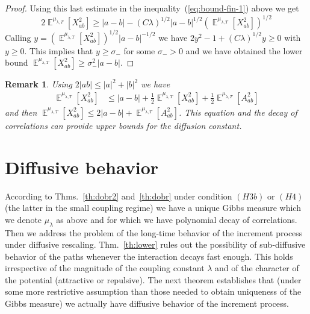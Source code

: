 \documentclass[a4paper,12pt,reqno]{amsart}
\newtheorem{remark}[theorem]{Remark}
\DeclareMathOperator{\expect}{{\mathbb E}}
\begin{document}
\begin{proof}
Using this last estimate in the inequality~(\ref{eq:bound-fin-1}) above we get
\begin{equation*}
 2 \expect^{\mu_{\lambda,T}} [X_{ab}^2 ] \ge 
|a-b| - (C\lambda)^{1/2}|a-b|^{1/2} 
\left(\expect^{\mu_{\lambda,T}}[ X_{ab}^2]\right)^{1/2} 
\end{equation*}
Calling $y = \left(\expect^{\mu_{\lambda,T}}[ X_{ab}^2]\right)^{1/2} |a-b|^{-1/2}$ we have
$
 2 y^2 -1 + (C\lambda)^{1/2}y \ge 0
$
with $y \ge 0$. This implies that $y \ge \sigma_-$ for some $\sigma_-> 0$ and we have obtained the lower bound
$
\expect^{\mu_{\lambda,T}} [X_{ab}^2 ] \ge \sigma^2_- |a-b|
$.
\end{proof}



\begin{remark}
Using
$
2|ab| \le |a|^2+|b|^2
$
we have
\begin{equation*}
  \begin{split}
\expect^{\mu_{\lambda,T}} [X_{ab}^2] & \le  |a-b| + \frac{1}{2}
 \expect^{\mu_{\lambda,T}} [X_{ab}^2]      
 + \frac{1}{2} \expect^{\mu_{\lambda,T}} \left[A_{ab}^2 \right]      
  \end{split}
\end{equation*}
and then
$\expect^{\mu_{\lambda,T}} [X_{ab}^2]  \le  2 |a-b| + \expect^{\mu_{\lambda,T}} \left[A_{ab}^2\right]      
$.
This equation and the decay of correlations can provide upper bounds for the diffusion constant.  
\end{remark}



\section{Diffusive behavior}
\label{sec:diffusive}
According to Thms.~\ref{th:dobr2} and~\ref{th:dobr} under condition $(H3b)$ or $(H4)$
(the latter in the small coupling regime)  we have a unique 
Gibbs measure  which we denote $\mu_\lambda$ as above and for which we
have polynomial decay of correlations.  
Then we address the problem of  the long-time behavior of the increment
process under diffusive rescaling. 
Thm.~\ref{th:lower} rules out the possibility of sub-diffusive behavior of the paths
whenever the interaction decays fast enough. This holds irrespective of the magnitude of the coupling constant $\lambda$ and of the character of the potential (attractive or repulsive).
The next theorem establishes that (under some more restrictive
assumption than those needed to obtain uniqueness of the Gibbs measure) we
actually have diffusive behavior of the increment process.
\end{document}
